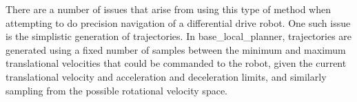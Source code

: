 There are a number of issues that arise from using this type of method when attempting to do precision navigation of a differential drive robot. One such issue is the simplistic generation of trajectories. In base\_local\_planner, trajectories are generated using a fixed number of samples between the minimum and maximum translational velocities that could be commanded to the robot, given the current translational velocity and acceleration and deceleration limits, and similarly sampling from the possible rotational velocity space.

